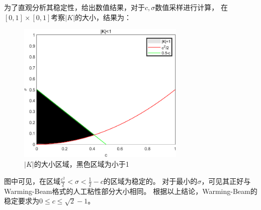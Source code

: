 \documentclass[UTF8,zihao=5]{ctexart} %
\begin{document}
为了直观分析其稳定性，给出数值结果，对于$c,\sigma$数值采样进行计算，
在$[0,1]\times[0,1]$考察$|K|$的大小，结果为：
\begin{figure}[H]
    \centering
    \includegraphics[width=8cm]{StableA.png}  %
    \caption{$|K|$的大小区域，黑色区域为小于1}
    \label{fig:a}
\end{figure}

图中可见，在区域$\frac{c^2}{2}<\sigma<\frac{1}{2}-c$的区域为稳定的。
对于最小的$\sigma$，可见其正好与Warming-Beam格式的人工粘性部分大小相同。
根据以上结论，Warming-Beam的稳定要求为$0\leq c\leq\sqrt{2}-1$。



























\end{document}

